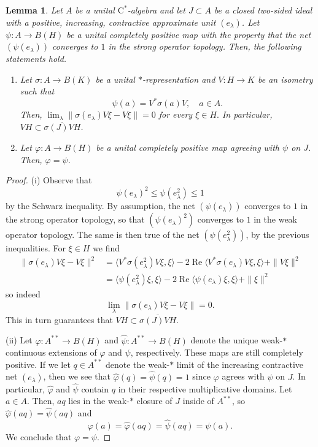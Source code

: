 \documentclass[10pt]{amsart}
\newcommand{\rC}{\mathrm{C}}
\renewcommand{\phi}{\varphi}
\newcommand{\ol}{\overline}
\newcommand{\re}{\operatorname{Re}}
\newtheorem{lemma}{Lemma}[section]
\theoremstyle{definition}
\begin{document}
\begin{lemma}\label{L:Stinespring}
Let $A$ be a unital $\rC^*$-algebra and let $J\subset A$ be a closed two-sided ideal with a positive, increasing, contractive approximate unit $(e_\lambda)$. Let $\psi:A\to B(H)$ be a unital completely positive map with the property that the net $(\psi(e_\lambda))$ converges to $1$ in the strong operator topology. Then, the following statements hold.
\begin{enumerate}[{\rm (i)}]
\item  Let $\sigma:A\to B(K)$ be a unital $*$-representation and $V:H\to K$ be an isometry such that 
\[
\psi(a)=V^*\sigma(a)V, \quad a\in A.
\] 
Then,  $\lim_\lambda \|\sigma(e_\lambda) V\xi-V\xi\|=0$ for every $\xi\in H.$ In particular, $VH\subset \ol{\sigma(J)VH}$.
\item Let  $\phi:A\to B(H)$ be a unital completely positive map agreeing with $\psi$ on $J$. Then, $\phi=\psi$.
\end{enumerate}
\end{lemma} 
\begin{proof}
(i) Observe that 
\[
\psi(e_\lambda)^2\leq \psi(e_\lambda^2)\leq 1
\]
by the Schwarz inequality. By assumption, the net $(\psi(e_\lambda))$ converges to $1$ in the strong operator topology, so that $(\psi(e_\lambda)^2)$ converges to $1$ in the weak operator topology. The same is then true of the net $(\psi(e_\lambda^2))$, by the previous inequalities. For $\xi\in H$ we find
\begin{align*}
\|\sigma(e_\lambda)V\xi-V\xi\|^2&=\langle V^*\sigma(e_\lambda^2)V\xi,\xi \rangle-2\re \langle V^* \sigma(e_\lambda)V\xi,\xi\rangle+\|V\xi\|^2\\
&=\langle \psi(e_\lambda^2)\xi,\xi\rangle -2\re \langle \psi(e_\lambda)\xi,\xi\rangle +\|\xi\|^2
\end{align*}
so indeed
\[
\lim_\lambda \|\sigma(e_\lambda) V\xi-V\xi\|=0.
\]
This in turn guarantees that $VH\subset \ol{\sigma(J)VH}$.

(ii) Let $\widehat\phi:A^{**}\to B(H)$ and $\widehat\psi:A^{**}\to B(H)$ denote the unique weak-$*$ continuous extensions of $\phi$ and $\psi$, respectively. These maps are still completely positive. If we let $q\in A^{**}$ denote the weak-$*$ limit of the increasing contractive net $(e_\lambda)$, then we see that $\widehat \phi(q)=\widehat \psi(q)=1$ since $\phi$ agrees with $\psi$ on $J$.
In particular, $\widehat\phi$ and $\widehat\psi$ contain $q$ in their respective multiplicative domains. Let $a\in A$.  Then, $aq$ lies in the weak-$*$ closure of $J$ inside of $A^{**}$, so $\widehat \phi(aq)=\widehat\psi(aq)$  and
\[
\phi(a)=\widehat\phi(aq)=\widehat \psi(aq)=\psi(a).
\]
We conclude that $\phi=\psi$.
\end{proof}
\end{document}

